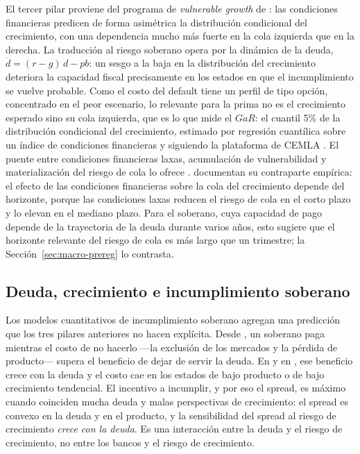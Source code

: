 El tercer pilar proviene del programa de \textit{vulnerable growth} de \citet{ABG2019b}: las condiciones financieras predicen de forma asimétrica la distribución condicional del crecimiento, con una dependencia mucho más fuerte en la cola izquierda que en la derecha. La traducción al riesgo soberano opera por la dinámica de la deuda, $\dot d=(r-g)\,d-pb$: un sesgo a la baja en la distribución del crecimiento deteriora la capacidad fiscal precisamente en los estados en que el incumplimiento se vuelve probable. Como el costo del default tiene un perfil de tipo opción, concentrado en el peor escenario, lo relevante para la prima no es el crecimiento esperado sino su cola izquierda, que es lo que mide el $GaR$: el cuantil 5\% de la distribución condicional del crecimiento, estimado por regresión cuantílica \citep{KoenkerBassett1978,Koenker2004} sobre un índice de condiciones financieras y siguiendo la plataforma de CEMLA \citep{OssandonBusch2022}. El puente entre condiciones financieras laxas, acumulación de vulnerabilidad y materialización del riesgo de cola lo ofrece \citet{Stein2012}. \citet{AdrianEtAl2022} documentan su contraparte empírica: el efecto de las condiciones financieras sobre la cola del crecimiento depende del horizonte, porque las condiciones laxas reducen el riesgo de cola en el corto plazo y lo elevan en el mediano plazo. Para el soberano, cuya capacidad de pago depende de la trayectoria de la deuda durante varios años, esto sugiere que el horizonte relevante del riesgo de cola es más largo que un trimestre; la Sección~\ref{sec:macro-prereg} lo contrasta.

\subsection{Deuda, crecimiento e incumplimiento soberano}
\label{sec:marco-incumplimiento}

Los modelos cuantitativos de incumplimiento soberano agregan una predicción que los tres pilares anteriores no hacen explícita. Desde \citet{EatonGersovitz1981}, un soberano paga mientras el costo de no hacerlo ---la exclusión de los mercados y la pérdida de producto--- supera el beneficio de dejar de servir la deuda. En \citet{Arellano2008} y en \citet{AguiarGopinath2006}, ese beneficio crece con la deuda y el costo cae en los estados de bajo producto o de bajo crecimiento tendencial. El incentivo a incumplir, y por eso el spread, es máximo cuando coinciden mucha deuda y malas perspectivas de crecimiento: el spread es convexo en la deuda y en el producto, y la sensibilidad del spread al riesgo de crecimiento \emph{crece con la deuda}. Es una interacción entre la deuda y el riesgo de crecimiento, no entre los bancos y el riesgo de crecimiento.

